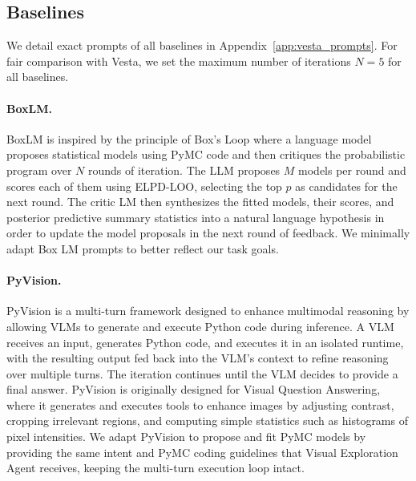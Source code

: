 \documentclass{article}
\newcommand{\method}{{\sc Vesta}}
\begin{document}
\subsection{Baselines}
\vspace{-0.3em}
We detail exact prompts of all baselines in Appendix~\ref{app:vesta_prompts}. For fair comparison with \method{}, we set the maximum number of iterations $N=5$ for all baselines. 

\paragraph{BoxLM.} BoxLM \cite{box_lm} is inspired by the principle of Box's Loop where a language model proposes statistical models using PyMC code and then critiques the probabilistic program over $N$ rounds of iteration. The LLM proposes $M$ models per round and scores each of them using ELPD-LOO,
selecting the top $p$ as candidates for the next round. The critic LM then synthesizes the fitted models, their scores, and posterior predictive summary statistics into a natural language hypothesis in order to update the model proposals in the next round of feedback. We minimally adapt Box LM prompts to better reflect our task goals. 

\vspace{-0.3em}
\paragraph{PyVision.} PyVision \cite{pyvision} is a multi-turn framework designed to enhance multimodal reasoning by allowing VLMs to generate and execute Python code during inference. A VLM receives an input, generates Python code, and executes it in an isolated runtime, with the resulting output fed back into the VLM's context to refine reasoning over multiple turns. The iteration continues until the VLM decides to provide a final answer. PyVision is originally designed for Visual Question Answering, where it generates and executes tools to enhance images by adjusting contrast, cropping irrelevant regions, and computing simple statistics such as histograms of pixel intensities. We adapt PyVision to propose and fit PyMC models by providing the same intent and PyMC coding guidelines that Visual Exploration Agent receives, keeping the multi-turn execution loop intact.
\end{document}
